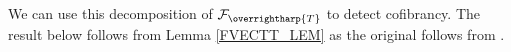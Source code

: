 \documentclass[a4paper,10pt
,draft
]{article}%
\numberwithin{equation}{section}
\numberwithin{figure}{section}
\theoremstyle{definition} %
\newcommand{\set}[1]{\left\{#1\right\}}%
\newcommand{\vect}[1]{\text{\overrightharp{\ensuremath{#1}}}}
\DeclareMathOperator{\Aut}{Aut}%
\newcommand{\F}{\ensuremath{\mathcal F}}
\newcommand{\1}{\ensuremath{\mathbbm 1}}%
\begin{document}
{  %

  We can use this decomposition of $\F_{\vect T}$ to detect cofibrancy.
  The result below follows from Lemma \ref{FVECTT_LEM} as the original \cite[Prop. 6.52]{BP_geo} follows from \cite[Lemma 6.49]{BP_geo}.
} %
\end{document}
